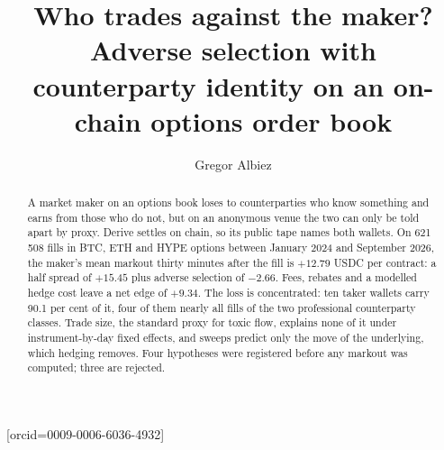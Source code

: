 \documentclass[a4paper,fleqn]{cas-dc}
\begin{document}

\title[mode=title]{Who trades against the maker? Adverse selection with counterparty identity on an on-chain options order book}
\tnotemark[1]

\author[1]{Gregor Albiez}[orcid=0009-0006-6036-4932]

\begin{abstract}
A market maker on an options book loses to counterparties who know something and earns from those who do
not, but on an anonymous venue the two can only be told apart by proxy. Derive settles on chain, so its
public tape names both wallets. On 621\,508 fills in BTC, ETH and HYPE options between January 2024 and
September 2026, the maker's mean markout thirty minutes after the fill is $+12.79$ USDC per contract: a half
spread of $+15.45$ plus adverse selection of $-2.66$. Fees, rebates and a modelled hedge cost leave a net
edge of $+9.34$. The loss is concentrated: ten taker wallets carry 90.1 per cent of it, four of them nearly
all fills of the two professional counterparty classes. Trade size, the standard proxy for toxic flow,
explains none of it under instrument-by-day fixed effects, and sweeps predict only the move of
the underlying, which hedging removes. Four hypotheses were registered before any markout was computed; three
are rejected.
\end{abstract}
\end{document}
